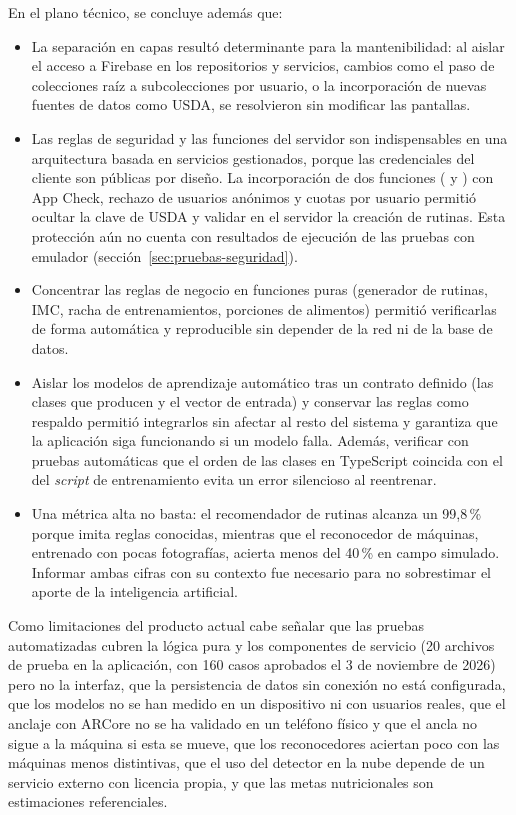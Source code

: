 En el plano técnico, se concluye además que:

\begin{itemize}
    \item La separación en capas resultó determinante para la mantenibilidad:
    al aislar el acceso a Firebase en los repositorios y servicios, cambios
    como el paso de colecciones raíz a subcolecciones por usuario, o la
    incorporación de nuevas fuentes de datos como USDA, se resolvieron sin
    modificar las pantallas.
    \item Las reglas de seguridad y las funciones del servidor son
    indispensables en una arquitectura basada en servicios gestionados, porque
    las credenciales del cliente son públicas por diseño. La incorporación de
    dos funciones ( y ) con
    App Check, rechazo de usuarios anónimos y cuotas por usuario permitió ocultar
    la clave de USDA y validar en el servidor la creación de rutinas. Esta
    protección aún no cuenta con resultados de ejecución de las pruebas con
    emulador (sección~\ref{sec:pruebas-seguridad}).
    \item Concentrar las reglas de negocio en funciones puras (generador de
    rutinas, IMC, racha de entrenamientos, porciones de alimentos) permitió
    verificarlas de forma automática y reproducible sin depender de la red ni
    de la base de datos.
    \item Aislar los modelos de aprendizaje automático tras un contrato
    definido (las clases que producen y el vector de entrada) y conservar las
    reglas como respaldo permitió integrarlos sin afectar al resto del sistema
    y garantiza que la aplicación siga funcionando si un modelo falla. Además,
    verificar con pruebas automáticas que el orden de las clases en TypeScript
    coincida con el del \emph{script} de entrenamiento evita un error silencioso
    al reentrenar.
    \item Una métrica alta no basta: el recomendador de rutinas alcanza un
    99,8\,\% porque imita reglas conocidas, mientras que el reconocedor de
    máquinas, entrenado con pocas fotografías, acierta menos del 40\,\% en
    campo simulado. Informar ambas cifras con su contexto fue necesario para
    no sobrestimar el aporte de la inteligencia artificial.
\end{itemize}

Como limitaciones del producto actual cabe señalar que las pruebas
automatizadas cubren la lógica pura y los componentes de servicio (20 archivos
de prueba en la aplicación, con 160 casos aprobados el 3 de noviembre de 2026)
pero no la interfaz, que la persistencia de datos sin conexión no está
configurada, que los modelos no se han medido en un dispositivo ni con usuarios
reales, que el anclaje con ARCore no se ha validado en un teléfono físico y que
el ancla no sigue a la máquina si esta se mueve, que los reconocedores aciertan
poco con las máquinas menos distintivas, que el uso del detector en la nube
depende de un servicio externo con licencia propia, y que las metas
nutricionales son estimaciones referenciales.


